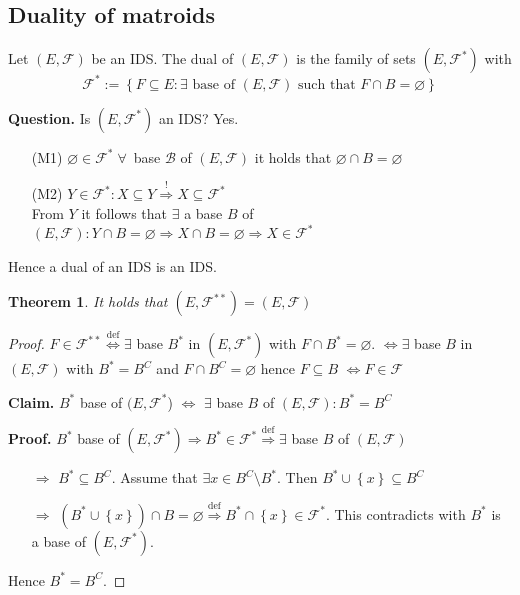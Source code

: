 \documentclass{article}
\newtheorem{theorem}{Theorem}
\newcommand{\set}[1]{\left\{#1\right\}}
\newcommand{\fall}{\;\forall\,}
\begin{document}
\subsection{Duality of matroids}
%
Let $(E, \mathcal{F})$ be an IDS. The dual of $(E, \mathcal{F})$ is the family of sets $(E, \mathcal{F}^*)$ with
\[
  \mathcal{F}^* := \set{F \subseteq E: \exists \text{ base of } (E, \mathcal{F}) \text{ such that } F \cap B = \diameter}
\]

\textbf{Question.}
  Is $(E, \mathcal{F}^*)$ an IDS? Yes.

  \begin{itemize}
    \item[(M1)] $\diameter \in \mathcal{F}^* \fall$ base $\mathcal{B}$ of $(E, \mathcal{F})$ it holds that $\diameter \cap B = \diameter$
    \item[(M2)] $Y \in \mathcal{F}^*: X \subseteq Y \stackrel{!}{\Rightarrow} X \subseteq \mathcal{F}^*$ \\
      From $Y$ it follows that $\exists$ a base $B$ of $(E, \mathcal{F}): Y \cap B = \diameter \Rightarrow X \cap B = \diameter \Rightarrow X \in \mathcal{F}^*$
  \end{itemize}

  Hence a dual of an IDS is an IDS.

\begin{theorem}
  \label{proposition-8.9}
  It holds that $(E, \mathcal{F}^{**}) = (E, \mathcal{F})$
\end{theorem}

\begin{proof}
  $F \in \mathcal{F}^{**} \stackrel{\text{def}}{\Leftrightarrow} \exists$ base $B^*$ in $(E, \mathcal{F}^*)$ with $F \cap B^* = \diameter$.
  $\Leftrightarrow \exists$ base $B$ in $(E, \mathcal{F})$ with $B^* = B^C$ and $F \cap B^C = \diameter$ hence $F \subseteq B$
  $\Leftrightarrow F \in \mathcal{F}$

  \textbf{Claim.} $B^*$ base of $(E, \mathcal{F}^*$) $\Leftrightarrow$ $\exists$ base $B$ of $(E, \mathcal{F}): B^* = B^C$

  \textbf{Proof.}
    $B^*$ base of $(E, \mathcal{F}^*) \Rightarrow B^* \in \mathcal{F}^* \stackrel{\text{def}}{\Rightarrow} \exists$ base $B$ of $(E, \mathcal{F})$
    \begin{itemize}
      \item[$\Rightarrow$] $B^* \subseteq B^C$. Assume that $\exists x \in B^C \setminus B^*$. Then $B^* \cup \set{x} \subseteq B^C$
      \item[$\Rightarrow$] $(B^* \cup \set{x}) \cap B = \diameter \stackrel{\text{def}}{\Rightarrow} B^* \cap \set{x} \in \mathcal{F}^*$. This contradicts with $B^*$ is a base of $(E, \mathcal{F}^*)$.
    \end{itemize}

  Hence $B^* = B^C$.
\end{proof}
\end{document}
